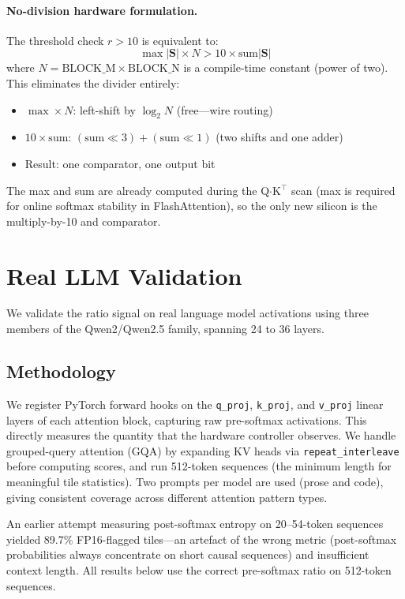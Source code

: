 \documentclass[10pt,twocolumn]{article}
\begin{document}
\paragraph{No-division hardware formulation.}
The threshold check $r > 10$ is equivalent to:
\[
\max|\mathbf{S}| \times N > 10 \times \mathrm{sum}|\mathbf{S}|
\]
where $N = \mathrm{BLOCK\_M} \times \mathrm{BLOCK\_N}$ is a
compile-time constant (power of two). This eliminates the divider
entirely:
\begin{itemize}
  \item $\max \times N$: left-shift by $\log_2 N$ (free---wire routing)
  \item $10 \times \mathrm{sum}$: $(\mathrm{sum} \ll 3) + (\mathrm{sum} \ll 1)$
  (two shifts and one adder)
  \item Result: one comparator, one output bit
\end{itemize}
The max and sum are already computed during the Q$\cdot$K$^\top$ scan
(max is required for online softmax stability in FlashAttention), so
the only new silicon is the multiply-by-10 and comparator.

\section{Real LLM Validation}
\label{sec:real_llm}

We validate the ratio signal on real language model activations using
three members of the Qwen2/Qwen2.5 family, spanning 24 to 36 layers.

\subsection{Methodology}

We register PyTorch forward hooks on the \texttt{q\_proj},
\texttt{k\_proj}, and \texttt{v\_proj} linear layers of each attention
block, capturing raw pre-softmax activations. This directly measures the
quantity that the hardware controller observes. We handle grouped-query
attention (GQA) by expanding KV heads via \texttt{repeat\_interleave}
before computing scores, and run 512-token sequences (the minimum length
for meaningful tile statistics). Two prompts per model are used (prose
and code), giving consistent coverage across different attention pattern
types.

An earlier attempt measuring post-softmax entropy on 20--54-token
sequences yielded 89.7\% FP16-flagged tiles---an artefact of the wrong
metric (post-softmax probabilities always concentrate on short causal
sequences) and insufficient context length. All results below use the
correct pre-softmax ratio on 512-token sequences.
\end{document}
